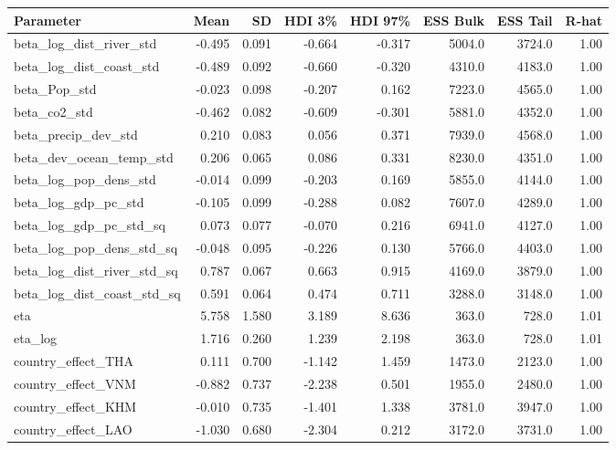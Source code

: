 \begin{table}[htbp]
\centering
{}
\label{tab:full_event_result}
\footnotesize
\begin{tabular}{lrrrrrrr}
\toprule
\textbf{Parameter} & \textbf{Mean} & \textbf{SD} & \textbf{HDI 3\%} & \textbf{HDI 97\%} & \textbf{ESS Bulk} & \textbf{ESS Tail} & \textbf{R-hat} \\
\midrule
beta\_log\_dist\_river\_std & -0.495 & 0.091 & -0.664 & -0.317 & 5004.0 & 3724.0 & 1.00 \\
beta\_log\_dist\_coast\_std & -0.489 & 0.092 & -0.660 & -0.320 & 4310.0 & 4183.0 & 1.00 \\
beta\_Pop\_std & -0.023 & 0.098 & -0.207 & 0.162 & 7223.0 & 4565.0 & 1.00 \\
beta\_co2\_std & -0.462 & 0.082 & -0.609 & -0.301 & 5881.0 & 4352.0 & 1.00 \\
beta\_precip\_dev\_std & 0.210 & 0.083 & 0.056 & 0.371 & 7939.0 & 4568.0 & 1.00 \\
beta\_dev\_ocean\_temp\_std & 0.206 & 0.065 & 0.086 & 0.331 & 8230.0 & 4351.0 & 1.00 \\
beta\_log\_pop\_dens\_std & -0.014 & 0.099 & -0.203 & 0.169 & 5855.0 & 4144.0 & 1.00 \\
beta\_log\_gdp\_pc\_std & -0.105 & 0.099 & -0.288 & 0.082 & 7607.0 & 4289.0 & 1.00 \\
beta\_log\_gdp\_pc\_std\_sq & 0.073 & 0.077 & -0.070 & 0.216 & 6941.0 & 4127.0 & 1.00 \\
beta\_log\_pop\_dens\_std\_sq & -0.048 & 0.095 & -0.226 & 0.130 & 5766.0 & 4403.0 & 1.00 \\
beta\_log\_dist\_river\_std\_sq & 0.787 & 0.067 & 0.663 & 0.915 & 4169.0 & 3879.0 & 1.00 \\
beta\_log\_dist\_coast\_std\_sq & 0.591 & 0.064 & 0.474 & 0.711 & 3288.0 & 3148.0 & 1.00 \\
eta & 5.758 & 1.580 & 3.189 & 8.636 & 363.0 & 728.0 & 1.01 \\
eta\_log & 1.716 & 0.260 & 1.239 & 2.198 & 363.0 & 728.0 & 1.01 \\
country\_effect\_THA & 0.111 & 0.700 & -1.142 & 1.459 & 1473.0 & 2123.0 & 1.00 \\
country\_effect\_VNM & -0.882 & 0.737 & -2.238 & 0.501 & 1955.0 & 2480.0 & 1.00 \\
country\_effect\_KHM & -0.010 & 0.735 & -1.401 & 1.338 & 3781.0 & 3947.0 & 1.00 \\
country\_effect\_LAO & -1.030 & 0.680 & -2.304 & 0.212 & 3172.0 & 3731.0 & 1.00 \\
\bottomrule
\end{tabular}
\end{table}
